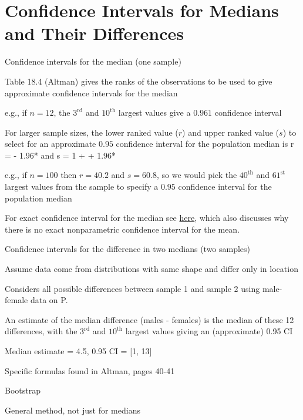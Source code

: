 \section{Confidence Intervals for Medians and Their Differences} \label{sec:nonpar-clmed}
\bi 
\item Confidence intervals for the median (one sample)
\bi 
\item Table 18.4 (Altman) gives the ranks of the observations to be
  used to give approximate confidence intervals for the median 
\item e.g., if $n = 12$, the $3^\textrm{rd}$ and $10^\textrm{th}$
  largest values give a $0.961$ confidence interval 
\item For larger sample sizes, the lower ranked value ($r$) and upper
  ranked value ($s$) to select for an approximate $0.95$ confidence
  interval for the population median is 
\beq
r =  - 1.96* \hspace{.4cm}\textrm{and}
\hspace{.4cm} s = 1 +  + 1.96* 
\eeq
\item e.g., if $n = 100$ then $r = 40.2$ and $s = 60.8$, so we would pick the $40^\textrm{th}$ and $61^\textrm{st}$ largest values from the sample to specify a $0.95$ confidence interval for the population median
\item For exact confidence interval for the median see
  \href{https://stats.stackexchange.com/questions/186957}{here}, which
  also discusses why there is no exact nonparametric confidence
  interval for the mean.
\ei
\item Confidence intervals for the difference in two medians (two samples)
\bi
\item Assume data come from distributions with same shape and differ only in location
\item Considers all possible differences between sample 1 and sample 2
  using male-female data on P.~\pageref{pg:nonpar-mf}
\item An estimate of the median difference (males - females) is the median of these 12 differences, with the $3^\textrm{rd}$ and $10^\textrm{th}$ largest values giving an (approximate) 0.95 CI
\item Median estimate = 4.5, 0.95 CI = [1, 13]
\item Specific formulas found in Altman, pages 40-41
\ei
\item Bootstrap 
\bi
\item General method, not just for medians
